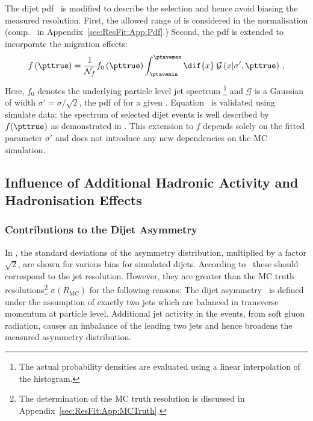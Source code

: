 The dijet pdf~ is modified to describe the
\ptave selection and hence avoid biasing the measured resolution.
First, the allowed range of \ptave is considered in the normalisation (comp.~ in Appendix~\ref{sec:ResFit:App:Pdf}.)
Second, the \pttrue pdf is extended to incorporate the migration effects:
\begin{equation}
  \label{eq:ResFit:DataDriven:ModifiedSpectrum}
  f\left(\pttrue\right) = \frac{1}{\mathcal{N}_{f}}
  f_{0}\left(\pttrue\right) \int^{\ptavemax}_{\ptavemin}\dif{x}\;\mathcal{G}\left(x|\sigma',\pttrue\right) \, ,
\end{equation}
Here, $f_{0}$ denotes the underlying particle level jet \pt spectrum \footnote{The actual probability densities are evaluated using a linear interpolation of the histogram.} and $\mathcal{G}$ is a Gaussian of width \mbox{$\sigma' = \sigma/\sqrt{2}$}, \ie the pdf of \ptave for a given \pttrue.
Equation~ is validated using simulate data:
the \ptgen spectrum of selected dijet events is well described by $f(\pttrue)$ as demonstrated in .
This extension to $f$ depends solely on the fitted parameter $\sigma'$ and does not introduce any new dependencies on the MC simulation.



\subsection{Influence of Additional Hadronic Activity and Hadronisation Effects}\label{sec:ResFit:DataDriven:AddJets}

\subsubsection{Contributions to the Dijet Asymmetry}\label{sec:ResFit:DataDriven:AddJets:Contributions}

In , the standard deviations of
the asymmetry distribution, multiplied by a factor $\sqrt{2}$,
are shown for various \ptgen bins for simulated dijets.
According to~ these should correspond to the
jet \pt resolution.
However, they are greater than the MC truth resolutions\footnote{The
  determination of the MC truth resolution is discussed in
  Appendix~\ref{sec:ResFit:App:MCTruth}.} $\sigma(R_{\text{MC}})$ for
the following reasons:
The dijet asymmetry~ is defined under the assumption of exactly two jets which are balanced in transverse momentum at particle level.
Additional jet activity in the events, \eg from soft gluon
radiation, causes an imbalance of the leading two jets and hence
broadens the measured asymmetry distribution.

